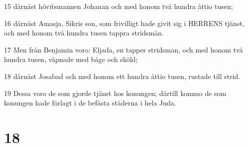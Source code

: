 \par 15 därnäst hövitsmannen Johanan och med honom två hundra åttio tusen;
\par 16 därnäst Amasja, Sikris son, som frivilligt hade givit sig i HERRENS tjänst, och med honom två hundra tusen tappra stridsmän.
\par 17 Men från Benjamin voro: Eljada, en tapper stridsman, och med honom två hundra tusen, väpnade med båge och sköld;
\par 18 därnäst Josabad och med honom ett hundra åttio tusen, rustade till strid.
\par 19 Dessa voro de som gjorde tjänst hos konungen; därtill kommo de som konungen hade förlagt i de befästa städerna i hela Juda.

\chapter{18}

